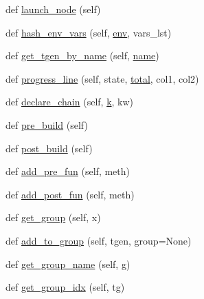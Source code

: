 \begin{DoxyCompactItemize}
\item 
def \hyperlink{classwaflib_1_1_build_1_1_build_context_a5ec1b12e273a3fcd437fd1e61292e8a1}{launch\+\_\+node} (self)
\item 
def \hyperlink{classwaflib_1_1_build_1_1_build_context_a4df53c421fdd1ea43eacfe0ec268fb07}{hash\+\_\+env\+\_\+vars} (self, \hyperlink{classwaflib_1_1_build_1_1_build_context_ac3b464a969bc6c898c739b6d820b2219}{env}, vars\+\_\+lst)
\item 
def \hyperlink{classwaflib_1_1_build_1_1_build_context_a158dba08b64d4a73b21a907ebe577017}{get\+\_\+tgen\+\_\+by\+\_\+name} (self, \hyperlink{lib_2expat_8h_a1b49b495b59f9e73205b69ad1a2965b0}{name})
\item 
def \hyperlink{classwaflib_1_1_build_1_1_build_context_af6341267231cfa8cabdfd595aede71fc}{progress\+\_\+line} (self, state, \hyperlink{classwaflib_1_1_build_1_1_build_context_a9242bac9596041fb6e91bd4f7cdbac51}{total}, col1, col2)
\item 
def \hyperlink{classwaflib_1_1_build_1_1_build_context_a6d24341f3d68e2a5a3987300d3d017fa}{declare\+\_\+chain} (self, \hyperlink{rfft2d_test_m_l_8m_adc468c70fb574ebd07287b38d0d0676d}{k}, kw)
\item 
def \hyperlink{classwaflib_1_1_build_1_1_build_context_a31b06f39986abefe3e129998b079f679}{pre\+\_\+build} (self)
\item 
def \hyperlink{classwaflib_1_1_build_1_1_build_context_aa8a25dd6bc5b621fa21d9806525e03df}{post\+\_\+build} (self)
\item 
def \hyperlink{classwaflib_1_1_build_1_1_build_context_a6ebf18db9a2bccd92de1506d261d7f03}{add\+\_\+pre\+\_\+fun} (self, meth)
\item 
def \hyperlink{classwaflib_1_1_build_1_1_build_context_a64d6fb9f73868bc70922fabaa0682fef}{add\+\_\+post\+\_\+fun} (self, meth)
\item 
def \hyperlink{classwaflib_1_1_build_1_1_build_context_ae9d4d76df236217e6c1ba262df1a7376}{get\+\_\+group} (self, x)
\item 
def \hyperlink{classwaflib_1_1_build_1_1_build_context_a4454ed8386bb714afcd240eedc360720}{add\+\_\+to\+\_\+group} (self, tgen, group=None)
\item 
def \hyperlink{classwaflib_1_1_build_1_1_build_context_a70172b57dd578379f3de337a479d1463}{get\+\_\+group\+\_\+name} (self, g)
\item 
def \hyperlink{classwaflib_1_1_build_1_1_build_context_a8b0e6338acd281989d32dd8a1502e745}{get\+\_\+group\+\_\+idx} (self, tg)
\item 

\end{DoxyCompactItemize}

